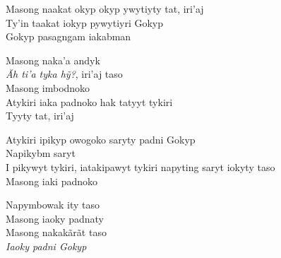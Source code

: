 \bigskip

\begin{linenumbers}\begingroup\raggedright
\noindent Masong naakat okyp okyp ywytiyty tat, iri'aj\\
Ty'in taakat iokyp pywytiyri Gokyp\\
Gokyp pasagngam iakabman
\end{linenumbers}\endgroup

\bigskip

\begin{linenumbers}\begingroup\raggedright
\noindent Masong naka'a andyk\\
\textit{Ãh ti'a tyka hỹ?}, iri'aj taso\\
Masong imbodnoko\\
Atykiri iaka padnoko hak tatyyt tykiri\\
Tyyty tat, iri'aj
\end{linenumbers}\endgroup

\bigskip

\begin{linenumbers}\begingroup\raggedright
\noindent Atykiri ipikyp owogoko saryty padni Gokyp\\
Napikybm saryt\\
I pikywyt tykiri, iatakipawyt tykiri napyting saryt iokyty taso\\
Masong iaki padnoko
\end{linenumbers}\endgroup

\bigskip

\begin{linenumbers}\begingroup\raggedright
\noindent Napymbowak ity taso\\
Masong iaoky padnaty\\
Masong nakakãrãt taso\\
\textit{Iaoky padni Gokyp}
\end{linenumbers}\endgroup

